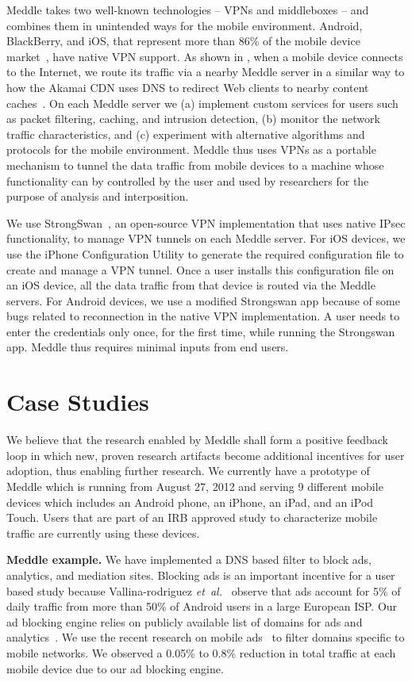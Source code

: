 \documentclass{sig-alternate-10pt}
\newcommand{\etal}{\emph{et~al.}}
\newcommand{\meddle}{{Meddle}\xspace}
\renewcommand{\fref}{\Fref}
\begin{document}
\meddle takes two well-known technologies -- VPNs and middleboxes --
and combines them in unintended ways for the mobile environment.
Android, BlackBerry, and iOS, that represent more than 86\% of the
mobile device market~\cite{gartner-phone-share}, have native VPN
support. As shown in \fref{fig:MeddleDeployment}, when a mobile device
connects to the Internet, we route its traffic via a nearby \meddle
server in a similar way to how the Akamai CDN uses DNS to redirect Web
clients to nearby content caches~\cite{akamai:cdn}. On each \meddle
server we (a) implement custom services for users such as packet
filtering, caching, and intrusion detection, (b) monitor the network
traffic characteristics, and (c) experiment with alternative
algorithms and protocols for the mobile environment. \meddle thus uses
VPNs as a portable mechanism to tunnel the data traffic from mobile
devices to a machine whose functionality can by controlled by the user
and used by researchers for the purpose of analysis and interposition.

We use StrongSwan~\cite{strongswan}, an open-source VPN implementation
that uses native IPsec functionality, to manage VPN tunnels on each
\meddle server. For iOS devices, we use the iPhone Configuration
Utility to generate the required configuration file to create and
manage a VPN tunnel. Once a user installs this configuration file on
an iOS device, all the data traffic from that device is routed via the 
\meddle servers. For Android devices, we use a modified Strongswan app
because of some bugs related to reconnection in the native VPN
implementation. A user needs to enter the credentials only once, for
the first time, while running the Strongswan app. \meddle thus
requires minimal inputs from end users.    

\section{Case Studies}

We believe that the research enabled by \meddle shall form a positive
feedback loop in which new, proven research artifacts become
additional incentives for user adoption, thus enabling further
research. We currently have a prototype of \meddle which is running
from August 27, 2012 and serving 9 different mobile devices which
includes an Android phone, an iPhone, an iPad, and an iPod
Touch. Users that are part of an IRB approved study to characterize
mobile traffic are currently using these devices. 

\textbf{\meddle example.} We have implemented a DNS based filter to
block ads, analytics, and mediation sites. Blocking ads is an
important incentive for a user based study because Vallina-rodriguez
\etal~\cite{Vallina-rodriguez:2012:AdCache} observe that ads account
for 5\% of daily traffic from more than 50\% of Android users in a
large European ISP. Our ad blocking engine relies on publicly
available list of domains for ads and analytics~\cite{YoyoAds}. We use
the recent research on mobile ads~\cite{Leontiadis:2012:AdsMobile,
  hornyack:appfence} to filter domains specific to mobile
networks. We observed a 0.05\% to 0.8\% reduction in total traffic
at each mobile device due to our ad blocking engine. 
\end{document}
